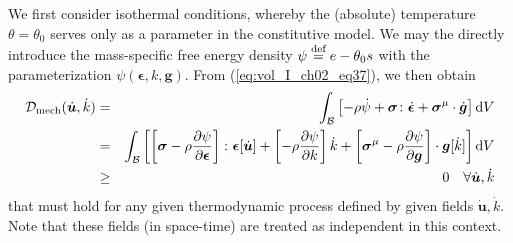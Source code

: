 We first consider isothermal conditions, whereby the (absolute) temperature $\theta=\theta_0$ serves only as a parameter in the constitutive model. We may the directly introduce the mass-specific free energy density $\psi\stackrel{\text{def}}{=} e-\theta_0 s$ with the parameterization $\psi(\bm{\epsilon},k,\bm{g})$. From (\ref{eq:vol_I_ch02_eq37}), we then obtain
\begin{eqnarray}
    {\mathcal D}_{\mathrm{mech}}(\dot{\bm{u}},\dot{k})
    &=& \int_{\mathcal{B}} \left[-\rho\dot{\psi} + \bm{\sigma}\colon\dot{\bm{\epsilon}} + \bm{\sigma}^{\mathrm{\mu}} \cdot \dot{\bm g} \right]\mathop{}\!\mathrm{d} V
    \nonumber \\
    &=&
    \int_{\mathcal{B}} \left[\left[\bm{\sigma} -\rho \frac{\partial \psi}{\partial \bm{\epsilon}}\right] \colon \bm{\epsilon}[\dot{\bm{u}}] + \left[- \rho \frac{\partial \psi}{\partial k}\right] \dot{k}
    + \left[\bm{\sigma}^{\mathrm{\mu}} -\rho \frac{\partial \psi}{\partial \bm{g}}\right] \cdot \bm{g}[\dot{k}] \right] \mathop{}\!\mathrm{d} V
    \nonumber \\
    &\geq& 0
    \quad \forall \dot{\bm{u}},\dot{k}
\label{eq:8-1}
\end{eqnarray}
that must hold for any given thermodynamic process defined by given fields $\dot{\bm{u}},\dot{k}$. Note that these fields (in space-time) are treated as independent in this context.

